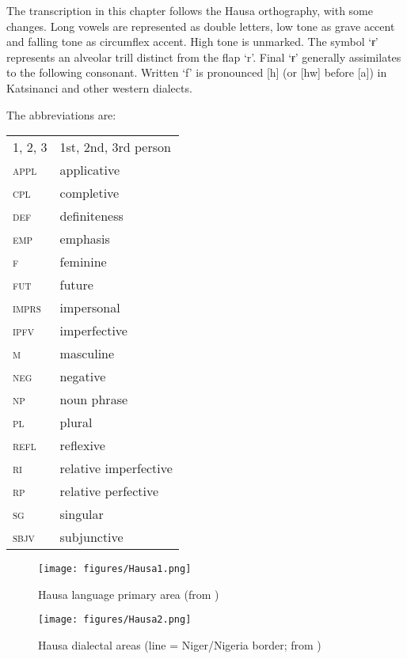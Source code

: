 \documentclass[output=paper]{langscibook}
\begin{document}
  The transcription in this chapter follows the Hausa orthography, with some changes. Long vowels are represented as double letters, low tone as grave accent and falling tone as circumflex accent. High tone is unmarked. The symbol `ɍ{}' represents an alveolar trill distinct from the flap `r'. Final ‘ɍ’ generally assimilates to the following consonant. Written `f' is pronounced [h] (or [hw] before [a]) in Katsinanci and other western dialects. 
  
  The abbreviations are:

\begin{tabularx}{.45\textwidth}[t]{lQ}
 1, 2, 3 & 1st, 2nd, 3rd person\\
 \textsc{appl} & applicative\\
 \textsc{cpl} & completive\\
 \textsc{def} & definiteness\\
 \textsc{emp} & emphasis\\
 \textsc{f} & feminine\\
 \textsc{fut} & future\\
 \textsc{imprs} & impersonal\\
 \textsc{ipfv} & imperfective\\
 \textsc{m} & masculine\\
 \textsc{neg} & negative\\
 \textsc{np} & noun phrase\\
 \textsc{pl} & plural\\
 \textsc{refl} & reflexive\\
 \textsc{ri} & relative imperfective\\
 \textsc{rp} & relative perfective\\
 \textsc{sg} & singular\\
 \textsc{sbjv} & subjunctive\\
\end{tabularx}
  

\begin{figure}[H]
     \centering
     \texttt{[image: figures/Hausa1.png]}
     \caption{Hausa language primary area (from \citealt{Newman2000})}
     \label{fig:Abdoulaye:1}
\end{figure}

\begin{figure}[H]
     \centering
     \texttt{[image: figures/Hausa2.png]}
     \caption{Hausa dialectal areas \textmd{(line = Niger/Nigeria border; from \citealt{Wolff1993})}}
     \label{fig:Abdoulaye:2}
\end{figure}
 

 




{\sloppy\printbibliography[heading=subbibliography,notkeyword=this]}
\end{document}
